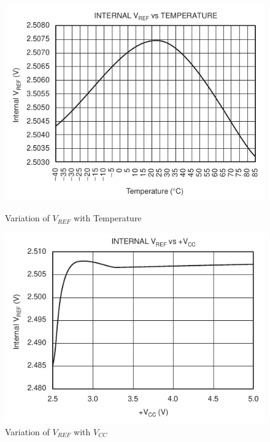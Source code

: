 \documentclass[11pt,a4paper,titlepage]{article}
\begin{document}
							\begin{figure}[htbp]
								\begin{minipage}{.5\textwidth}
									\centering
									\includegraphics[width=\textwidth]{v_ref_temp.png}
									\caption{Variation of $V_{REF}$ with Temperature}
									\label{fig:vref_temp}
								\end{minipage}
								\begin{minipage}{.5\textwidth}
									\centering
									\includegraphics[width=\textwidth]{v_ref_vcc.png}
									\caption{Variation of $V_{REF}$ with $V_{CC}$}
									\label{fig:vref_vcc}
								\end{minipage}
							\end{figure}
\end{document}
